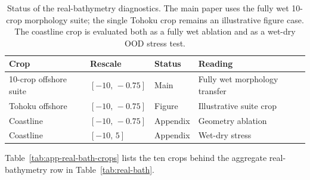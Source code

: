 \begin{table}[H]
\centering
\caption{Status of the real-bathymetry diagnostics. The main paper uses the fully wet 10-crop morphology suite; the single Tohoku crop remains an illustrative figure case. The coastline crop is evaluated both as a fully wet ablation and as a wet-dry OOD stress test.}
\label{tab:app-real-bath-status}
\begin{tabular}{llll}
    \toprule
    Crop & Rescale & Status & Reading \\
    \midrule
    10-crop offshore suite & $[-10,\,-0.75]$ & Main & Fully wet morphology transfer \\
    Tohoku offshore & $[-10,\,-0.75]$ & Figure & Illustrative suite crop \\
    Coastline & $[-10,\,-0.75]$ & Appendix & Geometry ablation \\
    Coastline & $[-10,\,5]$ & Appendix & Wet-dry stress \\
    \bottomrule
\end{tabular}
\end{table}

Table~\ref{tab:app-real-bath-crops} lists the ten crops behind the aggregate real-bathymetry row in Table~\ref{tab:real-bath}.

